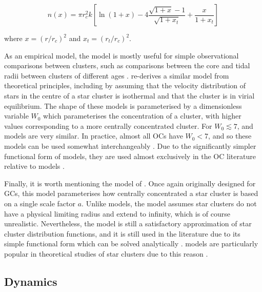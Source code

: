 \begin{equation}
	n(x) = \pi r_c^2 k \left[ \ln(1+x) - 4 \frac{\sqrt{1+x} - 1}{\sqrt{1 + x_t}} + \frac{x}{1 + x_t} \right]
\end{equation}

\noindent
where $x = (r / r_c)^2$ and $x_t = (r_t / r_c)^2$.

As an empirical model, the \cite{king_structure_star_1962} model is mostly useful for simple observational comparisons between clusters, such as comparisons between the core and tidal radii between clusters of different ages \citep{kharchenko_global_2013,tarricq_structural_2022}. \cite{king_structure_1966} re-derives a similar model from theoretical principles, including by assuming that the velocity distribution of stars in the centre of a star cluster is isothermal and that the cluster is in virial equilibrium. The shape of these models is parameterised by a dimensionless variable $W_0$ which parameterises the concentration of a cluster, with higher values corresponding to a more centrally concentrated cluster. For $W_0 \lesssim 7$, \cite{king_structure_star_1962} and \cite{king_structure_1966} models are very similar. In practice, almost all OCs have $W_0 < 7$, and so these models can be used somewhat interchangeably \citep{portegies_zwart_young_2010}. Due to the significantly simpler functional form of \cite{king_structure_star_1962} models, they are used almost exclusively in the OC literature relative to \cite{king_structure_1966} models \citep{portegies_zwart_young_2010,cantat-gaudin_milky_2022}.

Finally, it is worth mentioning the model of \cite{plummer_problem_1911}. Once again originally designed for GCs, this model parameterises how centrally concentrated a star cluster is based on a single scale factor $a$. Unlike \cite{king_structure_star_1962,king_structure_1966} models, the \cite{plummer_problem_1911} model assumes star clusters do not have a physical limiting radius and extend to infinity, which is of course unrealistic. Nevertheless, the \cite{plummer_problem_1911} model is still a satisfactory approximation of star cluster distribution functions, and it is still used in the literature due to its simple functional form which can be solved analytically \citep{dejonghe_completely_analytical_1987}. \cite{plummer_problem_1911} models are particularly popular in theoretical studies of star clusters due to this reason \citep{portegies_zwart_young_2010}.


\subsection{Dynamics}
\label{sec:intro:theory:dynamics}


